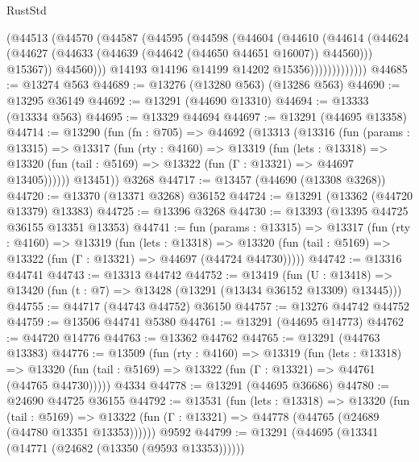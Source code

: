 \begin{lexlean}{RustStd}
\begin{coremodule}
                      (@44513
                        (@44570
                          (@44587
                            (@44595
                              (@44598
                                (@44604
                                  (@44610
                                    (@44614
                                      (@44624
                                        (@44627
                                          (@44633 (@44639 (@44642 (@44650 @44651 @16007)) @44560)))
                                        @15367))
                                    @44560)))
                              @14193
                              @14196
                              @14199
                              @14202
                              @15356)))))))))))))
@44685 := @13274 @563
@44689 := @13276 (@13280 @563) (@13286 @563)
@44690 := @13295 @36149
@44692 := @13291 (@44690 @13310)
@44694 := @13333 (@13334 @563)
@44695 := @13329 @44694
@44697 := @13291 (@44695 @13358)
@44714 := @13290
    (fun (fn : @705) =>
    @44692
      (@13313
        (@13316
          (fun (params : @13315) =>
          @13317
            (fun (rty : @4160) =>
            @13319
              (fun (lets : @13318) =>
              @13320 (fun (tail : @5169) => @13322 (fun (Γ : @13321) => @44697 @13405))))))
        @13451))
    @3268
@44717 := @13457 (@44690 (@13308 @3268))
@44720 := @13370 (@13371 @3268) @36152
@44724 := @13291 (@13362 (@44720 @13379) @13383)
@44725 := @13396 @3268
@44730 := @13393 (@13395 @44725 @36155 @13351 @13353)
@44741 := fun (params : @13315) =>
  @13317
    (fun (rty : @4160) =>
    @13319
      (fun (lets : @13318) =>
      @13320 (fun (tail : @5169) => @13322 (fun (Γ : @13321) => @44697 (@44724 @44730)))))
@44742 := @13316 @44741
@44743 := @13313 @44742
@44752 := @13419
    (fun (U : @13418) => @13420 (fun (t : @7) => @13428 (@13291 (@13434 @36152 @13309) @13445)))
@44755 := @44717 (@44743 @44752) @36150
@44757 := @13276 @44742 @44752
@44759 := @13506 @44741 @5380
@44761 := @13291 (@44695 @14773)
@44762 := @44720 @14776
@44763 := @13362 @44762
@44765 := @13291 (@44763 @13383)
@44776 := @13509
    (fun (rty : @4160) =>
    @13319
      (fun (lets : @13318) =>
      @13320 (fun (tail : @5169) => @13322 (fun (Γ : @13321) => @44761 (@44765 @44730)))))
    @4334
@44778 := @13291 (@44695 @36686)
@44780 := @24690 @44725 @36155
@44792 := @13531
    (fun (lets : @13318) =>
    @13320
      (fun (tail : @5169) =>
      @13322 (fun (Γ : @13321) => @44778 (@44765 (@24689 (@44780 @13351 @13353))))))
    @9592
@44799 := @13291 (@44695 (@13341 (@14771 (@24682 (@13350 (@9593 @13353))))))

\end{coremodule}
\end{lexlean}
